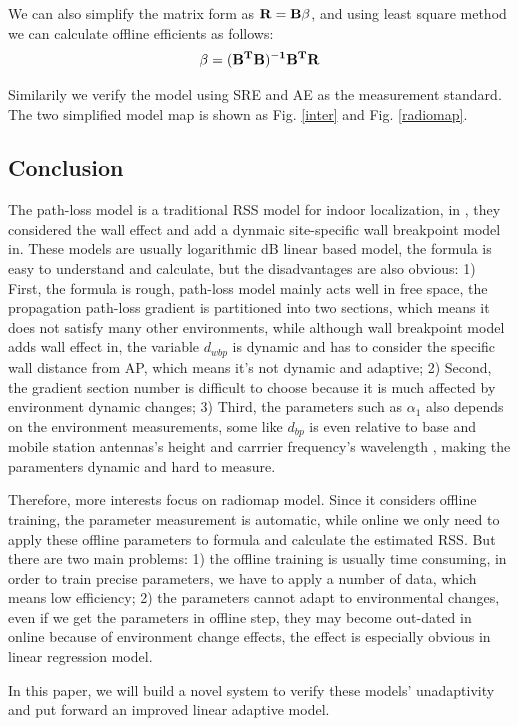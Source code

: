 \documentclass[10pt,conference]{IEEEtran}
\begin{document}
We can also simplify the matrix form as $\bold{R=B\beta}$, and using least square method we can calculate offline efficients as follows:
$$\bold{\beta=(B^TB)^{-1}B^TR}$$

Similarily we verify the model using SRE and AE as the measurement standard. The two simplified model map is shown as Fig. \ref{inter} and Fig. \ref{radiomap}.

\subsection{Conclusion}
The path-loss model is a traditional RSS model for indoor localization, in \cite{site}, they considered the wall effect and add a dynmaic site-specific wall breakpoint model in. These models are usually logarithmic dB linear based model, the formula is easy to understand and calculate, but the disadvantages are also obvious: 1) First, the formula is rough, path-loss model mainly acts well in free space, the propagation path-loss gradient is partitioned into two sections, which means it does not satisfy many other environments, while although wall breakpoint model adds wall effect in, the variable $d_{wbp}$ is dynamic and has to consider the specific wall distance from AP, which means it's not dynamic and adaptive; 2) Second, the gradient section number is difficult to choose because it is much affected by environment dynamic changes; 3) Third, the parameters such as $\alpha_1$ also depends on the environment measurements, some like $d_{bp}$ is even relative to base and mobile station antennas's height and carrrier frequency's wavelength \cite{wireless}, making the paramenters dynamic and hard to measure.

Therefore, more interests focus on radiomap model. Since it considers offline training, the parameter measurement is automatic, while online we only need to apply these offline parameters to formula and calculate the estimated RSS. But there are two main problems: 1) the offline training is usually time consuming, in order to train precise parameters, we have to apply a number of data, which means low efficiency; 2) the parameters cannot adapt to environmental changes, even if we get the parameters in offline step, they may become out-dated in online because of environment change effects, the effect is especially obvious in linear regression model.

In this paper, we will build a novel system to verify these models' unadaptivity and put forward an improved linear adaptive model.
\end{document}
